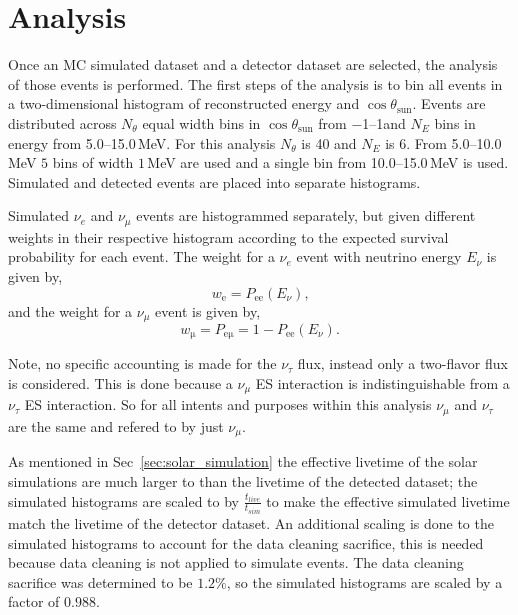 \section{Analysis}
Once an MC simulated dataset and a detector dataset are selected, the analysis
of those events is performed.
The first steps of the analysis is to bin all events
in a two-dimensional histogram of reconstructed energy and $\cos\theta_{\mathrm{sun}}$.
Events are distributed across $N_{\theta}$ equal width bins in $\cos\theta_{\mathrm{sun}}$ from
\numrange{-1}{1}and
$N_{E}$ bins in energy from \numrange{5.0}{15.0}\,MeV.
For this analysis $N_{\theta}$ is 40 and $N_{E}$ is 6.
From \numrange{5.0}{10.0}\,MeV $5$ bins of width $1$\,MeV are used and
a single bin from \numrange{10.0}{15.0}\,MeV is used.
Simulated and detected events are placed into separate histograms.

Simulated $\nu_{e}$ and $\nu_{\mu}$ events are histogrammed separately,
but given different weights in their respective histogram according to the expected survival probability
for each event.
The weight for a $\nu_{e}$ event with neutrino energy $E_{\nu}$ is given by,
\begin{equation}
    w_{\mathrm{e}} = P_{\mathrm{ee}}(E_{\nu})\text{,}
\end{equation}
and the weight for a $\nu_{\mu}$ event is given by,
\begin{equation}
    w_{\mathrm{\mu}}= P_{\mathrm{e\mu}} = 1 - P_{\mathrm{ee}}(E_{\nu})\text{.}
\end{equation}

Note, no specific accounting is made for the $\nu_{\tau}$ flux, instead
only a two-flavor flux is considered.
This is done because a $\nu_{\mu}$ ES interaction is indistinguishable
from a $\nu_{\tau}$ ES interaction.
So for all intents and purposes within this analysis $\nu_\mu$ and $\nu_\tau$
are the same and refered to by just $\nu_\mu$.

As mentioned in Sec~\ref{sec:solar_simulation}%
the effective livetime of the solar simulations are much larger to than
the livetime of the detected dataset; the simulated histograms are
scaled to by $\frac{t_{live}}{t_{sim}}$ to make the effective simulated
livetime match the livetime of the detector dataset.
An additional scaling is done to the simulated histograms to account
for the data cleaning sacrifice, this is needed because data cleaning
is not applied to simulate events.
The data cleaning sacrifice was determined to be $1.2\%$, so the
simulated histograms are scaled by a factor of $0.988$.

